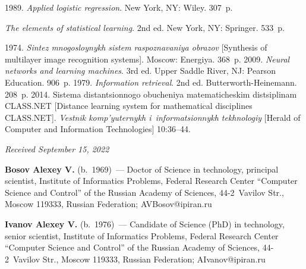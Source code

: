 \begin{multicols}{2}
{{\begin{thebibliography}{99}
 1989. \textit{Applied logistic regression}. New York, NY: 
Wiley. 307~p.

\pagebreak

 \textit{The elements of statistical learning}. 2nd 
ed. New York, NY: Springer. 533~p.

 1974. \textit{Sin\-tez mno\-go\-sloy\-nykh sis\-tem ras\-po\-zna\-va\-niya ob\-ra\-zov} [Synthesis 
of multilayer image recognition systems]. Moscow: Energiya. 368~p.
 2009. \textit{Neural networks and learning machines}. 3rd ed. Upper Saddle River, 
NJ: Pearson Education. 906~p.
 1979. \textit{Information retrieval}. 2nd ed. Butterworth-Heinemann. 208~p.
 2014. Sis\-te\-ma dis\-tan\-tsi\-on\-no\-go 
obuche\-niya ma\-te\-ma\-ti\-che\-skim dis\-tsip\-li\-nam CLASS.NET [Distance learning system for mathematical 
disciplines CLASS.NET]. \textit{Vestnik komp'yuternykh i~informatsionnykh tekhnologiy} [Herald of 
Computer and Information Technologies] 10:36--44.
\end{thebibliography}

 }
 }

\end{multicols}

\vspace*{-6pt}

\hfill{\small\textit{Received September 15, 2022}}

\Contr

\noindent
\textbf{Bosov Alexey V.} (b.\ 1969)~--- Doctor of Science in technology, principal scientist, Institute of 
Informatics Problems, Federal Research Center ``Computer Science and Control'' of the Russian 
Academy of Sciences, 44-2~Vavilov Str., Moscow 119333, Russian Federation; 
\mbox{AVBosov@ipiran.ru}

\vspace*{3pt}

\noindent
\textbf{Ivanov Alexey V.} (b.\ 1976)~--- Candidate of Science (PhD) in technology, senior scientist, 
Institute of Informatics Problems, Federal Research Center ``Computer Science and Control'' of the 
Russian Academy of Sciences, 44-2~Vavilov Str., Moscow 119333, Russian Federation; 
\mbox{AIvanov@ipiran.ru}


\label{end\stat}

\renewcommand{\bibname}{\protect\rm Литература}    